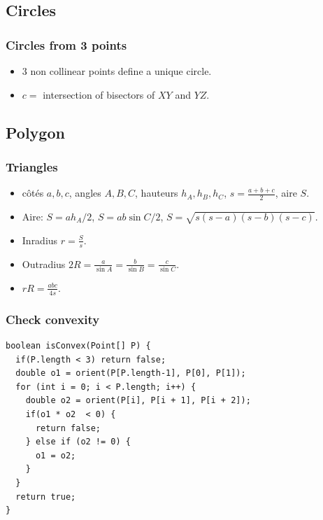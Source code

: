 \subsection{Circles}
\subsubsection{Circles from 3 points}
\begin{itemize}
\item $3$ non collinear points define a unique circle.
\item $c = $ intersection of bisectors of $XY$ and $YZ$.
\end{itemize}
\subsection{Polygon}
\subsubsection{Triangles}
\begin{itemize}
  \item côtés $a,b,c$, angles $A,B,C$, hauteurs $h_A,h_B,h_C$, $s=\frac{a+b+c}{2}$, aire $S$.
  \item Aire: $S=ah_A/2$, $S=ab\sin C/2$, $S=\sqrt{s(s-a)(s-b)(s-c)}$.
  \item Inradius $r=\frac{S}{s}$.
  \item Outradius $2R = \frac{a}{\sin A} = \frac{b}{\sin B} = \frac{c}{\sin C}$.
  \item $rR = \frac{abc}{4s}$.
\end{itemize}
\subsubsection{Check convexity}
\begin{lstlisting}
boolean isConvex(Point[] P) {
  if(P.length < 3) return false;
  double o1 = orient(P[P.length-1], P[0], P[1]);
  for (int i = 0; i < P.length; i++) {
    double o2 = orient(P[i], P[i + 1], P[i + 2]);
    if(o1 * o2  < 0) {
      return false;
    } else if (o2 != 0) {
      o1 = o2;
    }
  }
  return true;
}
\end{lstlisting}
